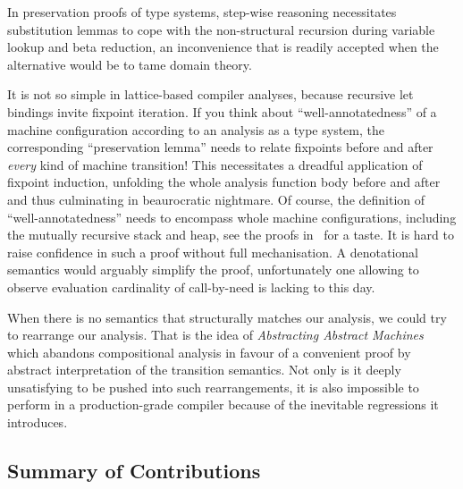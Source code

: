 In preservation proofs of type systems, step-wise reasoning necessitates
substitution lemmas to cope with the non-structural recursion during variable
lookup and beta reduction, an inconvenience that is readily accepted when the
alternative would be to tame domain theory.

It is not so simple in lattice-based compiler analyses, because recursive let
bindings invite fixpoint iteration. If you think about ``well-annotatedness''
of a machine configuration according to an analysis as a type system, the
corresponding ``preservation lemma'' needs to relate fixpoints before and after
\emph{every} kind of machine transition! This necessitates a dreadful application of fixpoint
induction, unfolding the whole analysis function body before and after and thus
culminating in beaurocratic nightmare.
Of course, the definition of ``well-annotatedness'' needs to encompass whole
machine configurations, including the mutually recursive stack and heap, see the
proofs in~\citep{cardinality-ext} for a taste. It is hard to raise confidence in
such a proof without full mechanisation.
A denotational semantics would arguably simplify the proof, unfortunately one
allowing to observe evaluation cardinality of call-by-need is lacking to this
day.

When there is no semantics that structurally matches our analysis, we could
try to rearrange our analysis. That is the idea of \emph{Abstracting Abstract
Machines}~\citep{aam} which abandons compositional analysis in favour of a
convenient proof by abstract interpretation of the transition semantics.
Not only is it deeply unsatisfying to be pushed into such rearrangements, it
is also impossible to perform in a production-grade compiler because of the
inevitable regressions it introduces.

\subsection{Summary of Contributions}

